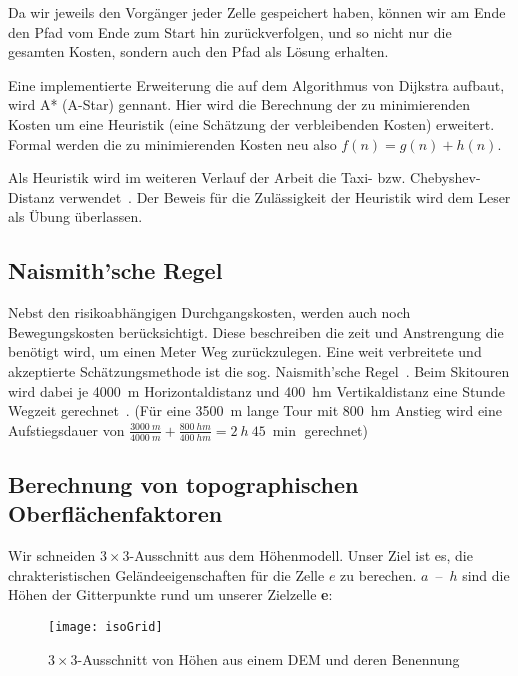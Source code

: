 Da wir jeweils den Vorgänger jeder Zelle gespeichert haben, können wir am Ende den Pfad vom Ende zum Start hin zurückverfolgen, und so nicht nur die gesamten Kosten, sondern auch den Pfad als Lösung erhalten.

Eine implementierte Erweiterung die auf dem Algorithmus von Dijkstra aufbaut, wird A* (A-Star) gennant. Hier wird die Berechnung der zu minimierenden Kosten um eine Heuristik (eine Schätzung der verbleibenden Kosten) erweitert. Formal werden die zu minimierenden Kosten neu also $f(n)=g(n)+h(n)$.~\cite{Hart1968}

Als Heuristik wird im weiteren Verlauf der Arbeit die Taxi- bzw. Chebyshev-Distanz verwendet~\cite{cantrell2000modern}. Der Beweis für die Zulässigkeit der Heuristik wird dem Leser als Übung überlassen. 

\subsection{Naismith'sche Regel}

Nebst den risikoabhängigen Durchgangskosten, werden auch noch Bewegungskosten berücksichtigt. Diese beschreiben die zeit und Anstrengung die benötigt wird, um einen Meter Weg zurückzulegen. Eine weit verbreitete und akzeptierte Schätzungsmethode ist die sog. Naismith'sche Regel~\cite{naismithsrule}.
Beim Skitouren wird dabei je \qty{4000}{m} Horizontaldistanz und \qty{400}{hm} Vertikaldistanz eine Stunde Wegzeit gerechnet~\cite{sacbergspwinter}\cite{naismithsrule}. (Für eine \qty{3500}{m} lange Tour mit \qty{800}{hm} Anstieg wird eine Aufstiegsdauer von $\frac{\qty{3000}{m}}{\qty{4000}{m}} + \frac{\qty{800}{hm}}{\qty{400}{hm}} = \qty{2}{h}\ \qty{45}{\min}$ gerechnet)


\subsection{Berechnung von topographischen Oberflächenfaktoren}

Wir schneiden $3 \times 3$-Ausschnitt aus dem Höhenmodell. Unser Ziel ist es, die chrakteristischen Geländeeigenschaften für die Zelle $e$ zu berechen.
$a$~--~$h$ sind die Höhen der Gitterpunkte rund um unserer Zielzelle \textbf{e}:

\begin{figure}[H]
  \centering
  \texttt{[image: isoGrid]}
  \caption{$3 \times 3$-Ausschnitt von Höhen aus einem DEM und deren Benennung}
\end{figure}

